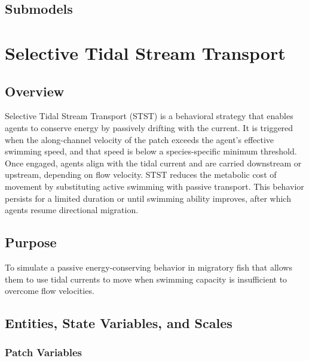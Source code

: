 \documentclass[
]{book}
\begin{document}
\section{Submodels}\label{submodels-4}

\chapter{Selective Tidal Stream Transport}\label{selective-tidal-stream-transport}

\section{Overview}\label{overview-6}

Selective Tidal Stream Transport (STST) is a behavioral strategy that enables agents to conserve energy by passively drifting with the current. It is triggered when the along-channel velocity of the patch exceeds the agent's effective swimming speed, and that speed is below a species-specific minimum threshold. Once engaged, agents align with the tidal current and are carried downstream or upstream, depending on flow velocity. STST reduces the metabolic cost of movement by substituting active swimming with passive transport. This behavior persists for a limited duration or until swimming ability improves, after which agents resume directional migration.

\section{Purpose}\label{purpose-5}

To simulate a passive energy-conserving behavior in migratory fish that allows them to use tidal currents to move when swimming capacity is insufficient to overcome flow velocities.

\section{Entities, State Variables, and Scales}\label{entities-state-variables-and-scales-5}

\subsection{Patch Variables}\label{patch-variables-5}
\end{document}
